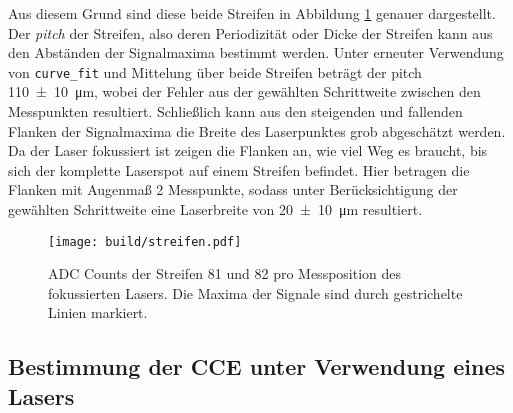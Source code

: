 Aus diesem Grund sind diese beide Streifen in Abbildung \ref{fig:streifen}
genauer dargestellt. Der \emph{pitch} der Streifen, also deren Periodizität oder
Dicke der Streifen kann aus den Abständen der Signalmaxima bestimmt werden.
Unter erneuter Verwendung von \texttt{curve\_fit} und Mittelung über beide Streifen
beträgt der pitch \SI{110(10)}{\micro\meter}, wobei der Fehler aus der gewählten
Schrittweite zwischen den Messpunkten resultiert.
Schließlich kann aus den steigenden und fallenden Flanken der Signalmaxima die
Breite des Laserpunktes grob abgeschätzt werden.
Da der Laser fokussiert ist zeigen die Flanken an, wie viel Weg es braucht, bis
sich der komplette Laserspot auf einem Streifen befindet.
Hier betragen die Flanken mit Augenmaß 2 Messpunkte, sodass unter Berücksichtigung
der gewählten Schrittweite eine Laserbreite von \SI{20(10)}{\micro\meter} resultiert.
\begin{figure}
  \centering
  \texttt{[image: build/streifen.pdf]}  %
  \caption{ADC Counts der Streifen 81 und 82 pro Messposition des fokussierten
  Lasers. Die Maxima der Signale sind durch gestrichelte Linien markiert.}
  \label{fig:streifen}
\end{figure}

\FloatBarrier
\subsection{Bestimmung der CCE unter Verwendung eines Lasers}
\label{sec:CCEL-Auswertung}

